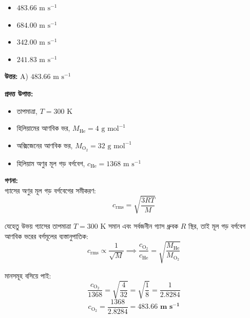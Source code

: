 \documentclass[12pt, a4paper]{article}
\begin{document}
\begin{itemize}[label={}, leftmargin=1cm, itemsep=0.5em]
    \item[\textbf{A)}] $483.66\text{ m s}^{-1}$
    \item[\textbf{B)}] $684.00\text{ m s}^{-1}$
    \item[\textbf{C)}] $342.00\text{ m s}^{-1}$
    \item[\textbf{D)}] $241.83\text{ m s}^{-1}$
\end{itemize}

\vspace{0.5em}
\begin{tcolorbox}[answerbox]
    \textbf{\color{success} উত্তর:} A) $483.66\text{ m s}^{-1}$
\end{tcolorbox}
\vspace{1em}

\begin{tcolorbox}[solutionbox={সমাধান (Solution)}]
    \noindent
    \textbf{প্রদত্ত উপাত্ত:}
    \begin{itemize}[leftmargin=1.5em, itemsep=0.2em]
        \item তাপমাত্রা, $T = 300\text{ K}$
        \item হিলিয়ামের আণবিক ভর, $M_{\text{He}} = 4\text{ g mol}^{-1}$
        \item অক্সিজেনের আণবিক ভর, $M_{\text{O}_2} = 32\text{ g mol}^{-1}$
        \item হিলিয়াম অণুর মূল গড় বর্গবেগ, $c_{\text{He}} = 1368\text{ m s}^{-1}$
    \end{itemize}

    \vspace{0.6em}
    \noindent\textbf{গণনা:} \\
    গ্যাসের অণুর মূল গড় বর্গবেগের সমীকরণ:
    \[ c_{\text{rms}} = \sqrt{\frac{3 R T}{M}} \]
    
    যেহেতু উভয় গ্যাসের তাপমাত্রা $T = 300\text{ K}$ সমান এবং সর্বজনীন গ্যাস ধ্রুবক $R$ স্থির, তাই মূল গড় বর্গবেগ আণবিক ভরের বর্গমূলের ব্যস্তানুপাতিক:
    \[ c_{\text{rms}} \propto \frac{1}{\sqrt{M}} \implies \frac{c_{\text{O}_2}}{c_{\text{He}}} = \sqrt{\frac{M_{\text{He}}}{M_{\text{O}_2}}} \]
    
    মানসমূহ বসিয়ে পাই:
    \[ \frac{c_{\text{O}_2}}{1368} = \sqrt{\frac{4}{32}} = \sqrt{\frac{1}{8}} = \frac{1}{2.8284} \]
    \[ c_{\text{O}_2} = \frac{1368}{2.8284} = \mathbf{483.66\text{ m s}^{-1}} \]
\end{tcolorbox}
\end{document}
